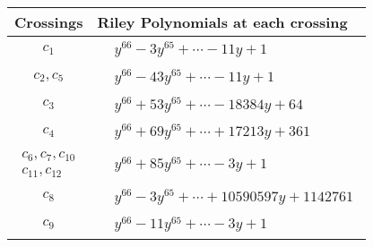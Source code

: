 \documentclass[1p]{elsarticle_modified}
\theoremstyle{definition}
\begin{document}
\begin{tabular}{m{50pt}|m{274pt}}
Crossings & \hspace{64pt}Riley Polynomials at each crossing \\
\hline $$\begin{aligned}c_{1}\end{aligned}$$&$\begin{aligned}
&y^{66}-3 y^{65}+\cdots-11 y+1
\end{aligned}$\\
\hline $$\begin{aligned}c_{2},c_{5}\end{aligned}$$&$\begin{aligned}
&y^{66}-43 y^{65}+\cdots-11 y+1
\end{aligned}$\\
\hline $$\begin{aligned}c_{3}\end{aligned}$$&$\begin{aligned}
&y^{66}+53 y^{65}+\cdots-18384 y+64
\end{aligned}$\\
\hline $$\begin{aligned}c_{4}\end{aligned}$$&$\begin{aligned}
&y^{66}+69 y^{65}+\cdots+17213 y+361
\end{aligned}$\\
\hline $$\begin{aligned}c_{6},c_{7},c_{10}\\c_{11},c_{12}\end{aligned}$$&$\begin{aligned}
&y^{66}+85 y^{65}+\cdots-3 y+1
\end{aligned}$\\
\hline $$\begin{aligned}c_{8}\end{aligned}$$&$\begin{aligned}
&y^{66}-3 y^{65}+\cdots+10590597 y+1142761
\end{aligned}$\\
\hline $$\begin{aligned}c_{9}\end{aligned}$$&$\begin{aligned}
&y^{66}-11 y^{65}+\cdots-3 y+1
\end{aligned}$\\
\hline
\end{tabular}
\vskip 2pc
\end{document}
